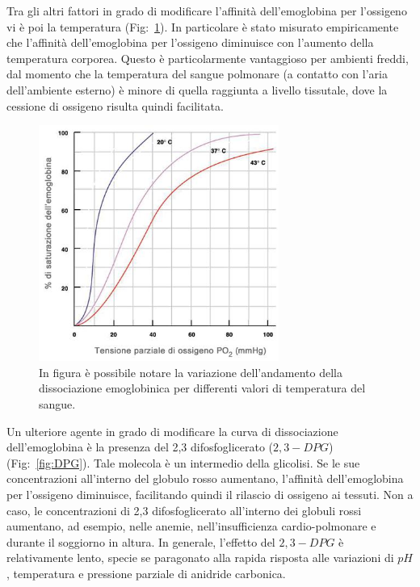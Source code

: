 \documentclass[a4paper, 12pt]{book}
\begin{document}
Tra gli altri fattori in grado di modificare l'affinità dell'emoglobina per l'ossigeno vi è poi la temperatura (Fig:~\ref{fig:T}).
In particolare è stato misurato empiricamente che l'affinità dell'emoglobina per l'ossigeno diminuisce con l'aumento della temperatura corporea.
Questo è particolarmente vantaggioso per ambienti freddi, dal momento che la temperatura del sangue polmonare (a contatto con l'aria dell'ambiente esterno) è minore di quella raggiunta a livello tissutale, dove la cessione di ossigeno risulta quindi facilitata.
\begin{figure}[h!]
    \centering
    \includegraphics[width=0.7\textwidth]{emoglobina-temperatura.jpeg}
    \caption{In figura è possibile notare la variazione dell'andamento della dissociazione emoglobinica per differenti valori di temperatura del sangue.}
    \label{fig:T}
\end{figure}
Un ulteriore agente in grado di modificare la curva di dissociazione dell'emoglobina è la presenza del 2,3 difosfoglicerato ($2,3-DPG$) (Fig:~\ref{fig:DPG}).
Tale molecola è un intermedio della glicolisi.
Se le sue concentrazioni all'interno del globulo rosso aumentano, l'affinità dell'emoglobina per l'ossigeno diminuisce, facilitando quindi il rilascio di ossigeno ai tessuti.
Non a caso, le concentrazioni di 2,3 difosfoglicerato all'interno dei globuli rossi aumentano, ad esempio, nelle anemie, nell'insufficienza cardio-polmonare e durante il soggiorno in altura.
In generale, l'effetto del $2,3-DPG$ è relativamente lento, specie se paragonato alla rapida risposta alle variazioni di $pH$, temperatura e pressione parziale di anidride carbonica.
\end{document}
